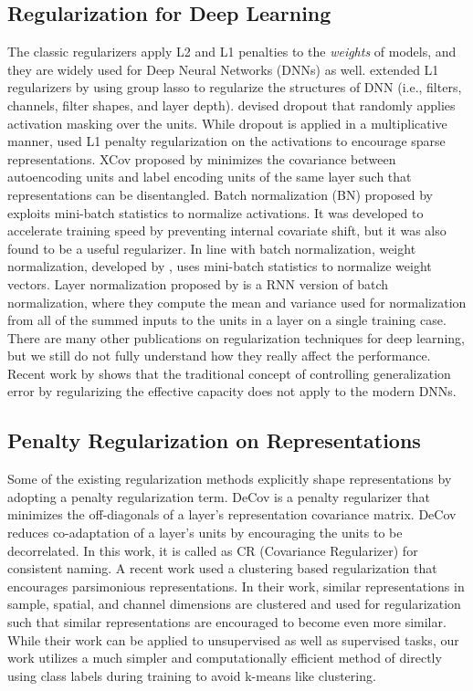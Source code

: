 \subsection{Regularization for Deep Learning}
%
The classic regularizers apply L2 \cite{hoerl1970ridge} and L1 \cite{tibshirani1996regression} 
penalties to the \textit{weights} of models, and they are widely used for Deep Neural Networks (DNNs) as well. 
%
\cite{wen2016learning} extended L1 regularizers by using group lasso to regularize 
the structures of DNN (i.e., filters, channels, filter shapes, and layer depth).
%
\cite{srivastava2014dropout} devised dropout that randomly applies activation masking 
over the units.
%
While dropout is applied in a multiplicative manner, \cite{glorot2011deep} used L1 penalty 
regularization on the activations to encourage sparse representations.
%
XCov proposed by \cite{cheung2014discovering} minimizes the covariance between 
autoencoding units and label encoding units of the same layer such that 
representations can be disentangled.  
%
Batch normalization (BN) proposed by \cite{ioffe2015batch} exploits mini-batch statistics 
to normalize activations. It was developed to accelerate training speed by preventing 
internal covariate shift, but it was also found to be a useful regularizer.
%
In line with batch normalization, weight normalization, developed by \cite{salimans2016weight}, 
uses mini-batch statistics to normalize weight vectors. 
%
Layer normalization proposed by \cite{ba2016layer} is a RNN version of batch normalization,
where they compute the mean and variance used for normalization from all of the summed
inputs to the units in a layer on a single training case.
%
There are many other publications on regularization techniques for deep learning,
but we still do not fully understand how they really affect the performance.  
Recent work by \cite{zhang2016understanding}
shows that the traditional concept of controlling generalization error by regularizing the effective capacity does not apply to the modern DNNs. 


\subsection{Penalty Regularization on Representations}
Some of the existing regularization methods explicitly shape representations by adopting a penalty regularization term.
%
DeCov \cite{cogswell2015reducing} is a penalty regularizer that minimizes the off-diagonals of a layer's representation covariance matrix. DeCov reduces co-adaptation of a layer's units by encouraging the units to be decorrelated. In this work, 
it is called as CR (Covariance Regularizer) for consistent naming.
%
A recent work \cite{liao2016learning} used a clustering based regularization that encourages parsimonious representations. In their work, similar representations in sample, spatial, and channel dimensions are clustered and used for regularization such that similar representations are encouraged to become even more similar. While their work can be applied to unsupervised as well as supervised tasks, our work utilizes a much simpler and computationally efficient method of directly using class labels during training to avoid k-means like clustering. 

